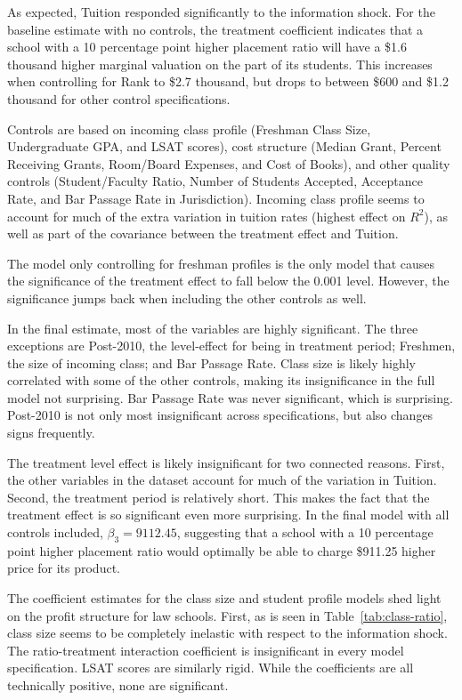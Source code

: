 \documentclass[12pt]{article}
\theoremstyle{definition}
\begin{document}
As expected, Tuition responded significantly to the information shock. For the baseline estimate with no controls, the treatment coefficient indicates that a school with a 10 percentage point higher placement ratio will have a \$1.6 thousand higher marginal valuation on the part of its students. This increases when controlling for Rank to \$2.7 thousand, but drops to between \$600 and \$1.2 thousand for other control specifications.

Controls are based on incoming class profile (Freshman Class Size, Undergraduate GPA, and LSAT scores), cost structure (Median Grant, Percent Receiving Grants, Room/Board Expenses, and Cost of Books), and other quality controls (Student/Faculty Ratio, Number of Students Accepted, Acceptance Rate, and Bar Passage Rate in Jurisdiction). Incoming class profile seems to account for much of the extra variation in tuition rates (highest effect on $R^2$), as well as part of the covariance between the treatment effect and Tuition.

The model only controlling for freshman profiles is the only model that causes the significance of the treatment effect to fall below the 0.001 level. However, the significance jumps back when including the other controls as well.

In the final estimate, most of the variables are highly significant. The three exceptions are Post-2010, the level-effect for being in treatment period; Freshmen, the size of incoming class; and Bar Passage Rate. Class size is likely highly correlated with some of the other controls, making its insignificance in the full model not surprising. Bar Passage Rate was never significant, which is surprising. Post-2010 is not only most insignificant across specifications, but also changes signs frequently.

The treatment level effect is likely insignificant for two connected reasons. First, the other variables in the dataset account for much of the variation in Tuition. Second, the treatment period is relatively short. This makes the fact that the treatment effect is so significant even more surprising. In the final model with all controls included, $\beta_3=9112.45$, suggesting that a school with a 10 percentage point higher placement ratio would optimally be able to charge \$911.25 higher price for its product.

The coefficient estimates for the class size and student profile models shed light on the profit structure for law schools. First, as is seen in Table~\ref{tab:class-ratio}, class size seems to be completely inelastic with respect to the information shock. The ratio-treatment interaction coefficient is insignificant in every model specification. LSAT scores are similarly rigid. While the coefficients are all technically positive, none are significant.
\end{document}
